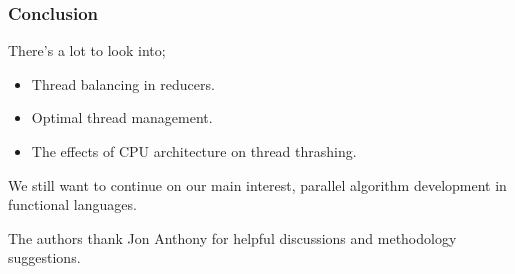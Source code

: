 \documentclass{beamer}
\begin{document}
\begin{frame}
\frametitle{Conclusion}
	There's a lot to look into;
	\begin{itemize}
	\item Thread balancing in reducers.
	\item Optimal thread management.
	\item The effects of CPU architecture on thread thrashing.
	\end{itemize}
We still want to continue on our main interest, parallel algorithm development in functional languages.
\par
The authors thank Jon Anthony for helpful discussions and methodology suggestions. 
\end{frame}
\end{document}
